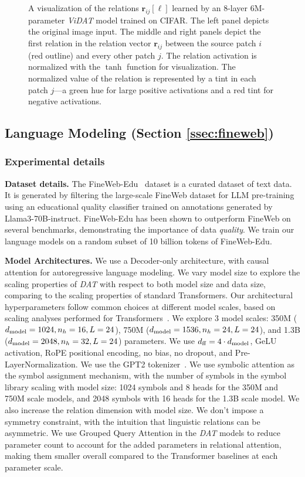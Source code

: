 \begin{figure}
    \caption{A visualization of the relations $\bm{r}_{ij}[\ell]$ learned by an $8$-layer $6$M-parameter \textit{ViDAT} model trained on CIFAR. The left panel depicts the original image input. The middle and right panels depict the first relation in the relation vector $\bm{r}_{ij}$ between the source patch $i$ (red outline) and every other patch $j$. The relation activation is normalized with the $\tanh$ function for visualization. The normalized value of the relation is represented by a tint in each patch $j$---a green hue for large positive activations and a red tint for negative activations.}\label{fig:vidat_viz}
\end{figure}

\subsection{Language Modeling (Section \ref{ssec:fineweb})}\label{ssec:appendix_fineweb}

\subsubsection*{Experimental details}

\textbf{Dataset details.} The FineWeb-Edu~\citep{lozhkov2024fineweb-edu} dataset is a curated dataset of text data. It is generated by filtering the large-scale FineWeb dataset for LLM pre-training~\citep{penedo2024finewebdatasetsdecantingweb} using an educational quality classifier trained on annotations generated by Llama3-70B-instruct. FineWeb-Edu has been shown to outperform FineWeb on several benchmarks, demonstrating the importance of data \textit{quality}. We train our language models on a random subset of 10 billion tokens of FineWeb-Edu.

\textbf{Model Architectures.} We use a Decoder-only architecture, with causal attention for autoregressive language modeling. We vary model size to explore the scaling properties of \textit{DAT} with respect to both model size and data size, comparing to the scaling properties of standard Transformers. Our architectural hyperparameters follow common choices at different model scales, based on scaling analyses performed for Transformers~\citep{penedo2024finewebdatasetsdecantingweb}. We explore 3 model scales: 350M ($d_{\mathrm{model}} = 1024, n_h = 16, L = 24$), 750M ($d_{\mathrm{model}} = 1536, n_h = 24, L = 24$), and 1.3B ($d_{\mathrm{model}} = 2048, n_h = 32, L = 24$) parameters. We use $d_{\mathrm{ff}} = 4 \cdot d_{\mathrm{model}}$, GeLU activation, RoPE positional encoding, no bias, no dropout, and Pre-LayerNormalization. We use the GPT2 tokenizer~\citep{radford2019language}. We use symbolic attention as the symbol assignment mechanism, with the number of symbols in the symbol library scaling with model size: 1024 symbols and 8 heads for the 350M and 750M scale models, and 2048 symbols with 16 heads for the 1.3B scale model. We also increase the relation dimension with model size. We don't impose a symmetry constraint, with the intuition that linguistic relations can be asymmetric. We use Grouped Query Attention in the \textit{DAT} models to reduce parameter count to account for the added parameters in relational attention, making them smaller overall compared to the Transformer baselines at each parameter scale.

